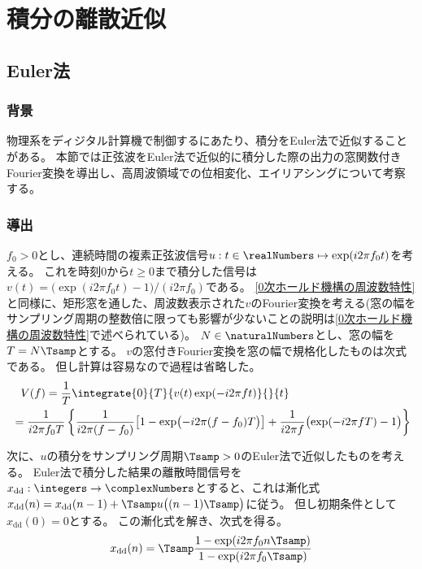 \chapter{積分の離散近似}
    \section{Euler法}
        \subsection{背景}
            物理系をディジタル計算機で制御するにあたり、積分をEuler法で近似することがある。
            本節では正弦波をEuler法で近似的に積分した際の出力の窓関数付きFourier変換を導出し、高周波領域での位相変化、エイリアシングについて考察する。
        \subsection{導出}
            \newcommand{\xdd}{x_\text{dd}}
            $f_0>0$とし、連続時間の複素正弦波信号$u:t\in\realNumbers\mapsto\exp(i 2\pi f_0 t)$を考える。
            これを時刻$0$から$t\geq 0$まで積分した信号は$v(t) = \bigl(\exp(i 2\pi f_0 t)-1\bigr) / (i 2\pi f_0)$である。
            \ref{0次ホールド機構の周波数特性}と同様に、矩形窓を通した、周波数表示された$v$のFourier変換を考える(窓の幅をサンプリング周期の整数倍に限っても影響が少ないことの説明は\ref{0次ホールド機構の周波数特性}で述べられている)。
            $N\in\naturalNumbers$とし、窓の幅を$T=N\Tsamp$とする。
            $v$の窓付きFourier変換を窓の幅で規格化したものは次式である。
            但し計算は容易なので過程は省略した。
            \begin{align*}
                &\phantom{=} V(f) = \frac{1}{T} \integrate{0}{T}{v(t)\exp(-i 2\pi f t)}{}{t} \\
                &= \frac{1}{i 2\pi f_0 T} \left\{\frac{1}{i 2\pi (f-f_0)}\bigl[1 - \exp\bigl(-i 2\pi (f-f_0)T\bigr)\bigr] + \frac{1}{i 2\pi f}\bigl(\exp(-i 2\pi f T) - 1\bigr)\right\}
            \end{align*}
            \par
            次に、$u$の積分をサンプリング周期$\Tsamp>0$のEuler法で近似したものを考える。
            Euler法で積分した結果の離散時間信号を$\xdd:\integers\to\complexNumbers$とすると、これは漸化式$\xdd(n) = \xdd(n-1) + \Tsamp u\bigl((n-1)\Tsamp\bigr)$に従う。
            但し初期条件として$\xdd(0)=0$とする。
            この漸化式を解き、次式を得る。
            \[ \xdd(n) = \Tsamp\frac{1-\exp(i 2\pi f_0 n\Tsamp)}{1-\exp(i 2\pi f_0\Tsamp)} \]
